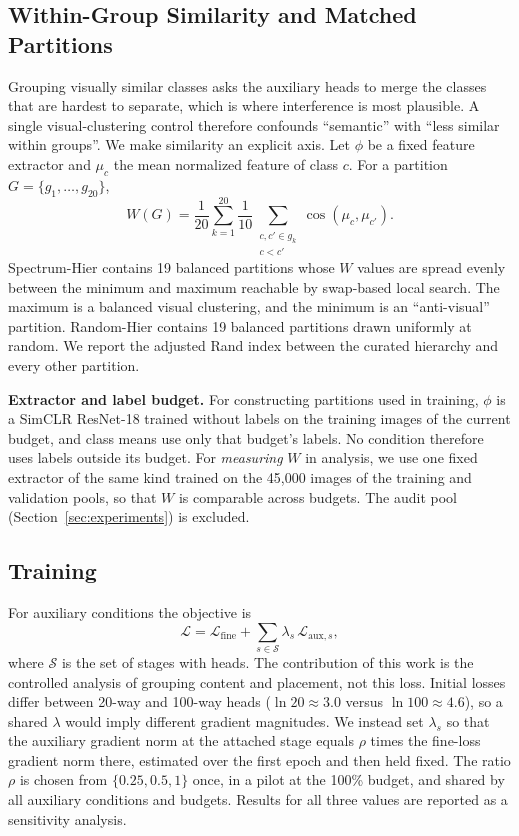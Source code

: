 \documentclass[conference]{IEEEtran}
\begin{document}
\subsection{Within-Group Similarity and Matched Partitions}
\label{sec:spectrum}
Grouping visually similar classes asks the auxiliary heads to merge the classes that are hardest to separate, which is where interference is most plausible. A single visual-clustering control therefore confounds ``semantic'' with ``less similar within groups''. We make similarity an explicit axis. Let $\phi$ be a fixed feature extractor and $\mu_c$ the mean normalized feature of class $c$. For a partition $G=\{g_1,\ldots,g_{20}\}$,
\begin{equation}
W(G)=\frac{1}{20}\sum_{k=1}^{20}\frac{1}{10}\sum_{\substack{c,c'\in g_k\\ c<c'}}\cos(\mu_c,\mu_{c'}).
\label{eq:w}
\end{equation}
Spectrum-Hier contains 19 balanced partitions whose $W$ values are spread evenly between the minimum and maximum reachable by swap-based local search. The maximum is a balanced visual clustering, and the minimum is an ``anti-visual'' partition. Random-Hier contains 19 balanced partitions drawn uniformly at random. We report the adjusted Rand index between the curated hierarchy and every other partition.

\textbf{Extractor and label budget.} For constructing partitions used in training, $\phi$ is a SimCLR ResNet-18 \cite{chen2020simclr} trained without labels on the training images of the current budget, and class means use only that budget's labels. No condition therefore uses labels outside its budget. For \emph{measuring} $W$ in analysis, we use one fixed extractor of the same kind trained on the 45,000 images of the training and validation pools, so that $W$ is comparable across budgets. The audit pool (Section~\ref{sec:experiments}) is excluded.

\subsection{Training}
For auxiliary conditions the objective is
\begin{equation}
\mathcal{L}=\mathcal{L}_{\mathrm{fine}}+\sum_{s\in\mathcal{S}}\lambda_s\,\mathcal{L}_{\mathrm{aux},s},
\label{eq:objective}
\end{equation}
where $\mathcal{S}$ is the set of stages with heads. The contribution of this work is the controlled analysis of grouping content and placement, not this loss. Initial losses differ between 20-way and 100-way heads ($\ln 20\approx 3.0$ versus $\ln 100\approx 4.6$), so a shared $\lambda$ would imply different gradient magnitudes. We instead set $\lambda_s$ so that the auxiliary gradient norm at the attached stage equals $\rho$ times the fine-loss gradient norm there, estimated over the first epoch and then held fixed. The ratio $\rho$ is chosen from $\{0.25,0.5,1\}$ once, in a pilot at the 100\% budget, and shared by all auxiliary conditions and budgets. Results for all three values are reported as a sensitivity analysis.
\end{document}
